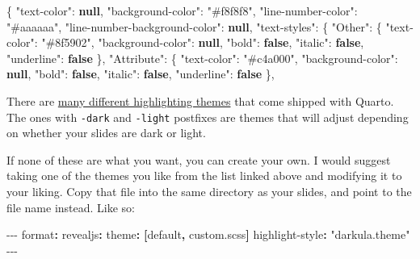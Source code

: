 \documentclass[
  letterpaper,
  DIV=11,
  numbers=noendperiod]{scrreprt}
\newenvironment{Shaded}{\begin{snugshade}}{\end{snugshade}}
\newcommand{\AttributeTok}[1]{\textcolor[rgb]{0.40,0.45,0.13}{#1}}
\newcommand{\DataTypeTok}[1]{\textcolor[rgb]{0.68,0.00,0.00}{#1}}
\newcommand{\FunctionTok}[1]{\textcolor[rgb]{0.28,0.35,0.67}{#1}}
\newcommand{\KeywordTok}[1]{\textcolor[rgb]{0.00,0.23,0.31}{\textbf{#1}}}
\newcommand{\PreprocessorTok}[1]{\textcolor[rgb]{0.68,0.00,0.00}{#1}}
\newcommand{\StringTok}[1]{\textcolor[rgb]{0.13,0.47,0.30}{#1}}
\begin{document}
\begin{Shaded}
\begin{Highlighting}[]
\FunctionTok{\{}
    \DataTypeTok{"text{-}color"}\FunctionTok{:} \KeywordTok{null}\FunctionTok{,}
    \DataTypeTok{"background{-}color"}\FunctionTok{:} \StringTok{"\#f8f8f8"}\FunctionTok{,}
    \DataTypeTok{"line{-}number{-}color"}\FunctionTok{:} \StringTok{"\#aaaaaa"}\FunctionTok{,}
    \DataTypeTok{"line{-}number{-}background{-}color"}\FunctionTok{:} \KeywordTok{null}\FunctionTok{,}
    \DataTypeTok{"text{-}styles"}\FunctionTok{:} \FunctionTok{\{}
        \DataTypeTok{"Other"}\FunctionTok{:} \FunctionTok{\{}
            \DataTypeTok{"text{-}color"}\FunctionTok{:} \StringTok{"\#8f5902"}\FunctionTok{,}
            \DataTypeTok{"background{-}color"}\FunctionTok{:} \KeywordTok{null}\FunctionTok{,}
            \DataTypeTok{"bold"}\FunctionTok{:} \KeywordTok{false}\FunctionTok{,}
            \DataTypeTok{"italic"}\FunctionTok{:} \KeywordTok{false}\FunctionTok{,}
            \DataTypeTok{"underline"}\FunctionTok{:} \KeywordTok{false}
        \FunctionTok{\},}
        \DataTypeTok{"Attribute"}\FunctionTok{:} \FunctionTok{\{}
            \DataTypeTok{"text{-}color"}\FunctionTok{:} \StringTok{"\#c4a000"}\FunctionTok{,}
            \DataTypeTok{"background{-}color"}\FunctionTok{:} \KeywordTok{null}\FunctionTok{,}
            \DataTypeTok{"bold"}\FunctionTok{:} \KeywordTok{false}\FunctionTok{,}
            \DataTypeTok{"italic"}\FunctionTok{:} \KeywordTok{false}\FunctionTok{,}
            \DataTypeTok{"underline"}\FunctionTok{:} \KeywordTok{false}
        \FunctionTok{\},}
\end{Highlighting}
\end{Shaded}

There are
\href{https://github.com/quarto-dev/quarto-cli/tree/main/src/resources/pandoc/highlight-styles}{many
different highlighting themes} that come shipped with Quarto. The ones
with \texttt{-dark} and \texttt{-light} postfixes are themes that will
adjust depending on whether your slides are dark or light.

If none of these are what you want, you can create your own. I would
suggest taking one of the themes you like from the list linked above and
modifying it to your liking. Copy that file into the same directory as
your slides, and point to the file name instead. Like so:

\begin{Shaded}
\begin{Highlighting}[]
\PreprocessorTok{{-}{-}{-}}
\FunctionTok{format}\KeywordTok{:}
\AttributeTok{  }\FunctionTok{revealjs}\KeywordTok{:}\AttributeTok{ }
\AttributeTok{    }\FunctionTok{theme}\KeywordTok{:}\AttributeTok{ }\KeywordTok{[}\AttributeTok{default}\KeywordTok{,}\AttributeTok{ custom.scss}\KeywordTok{]}
\FunctionTok{highlight{-}style}\KeywordTok{:}\AttributeTok{ }\StringTok{"darkula.theme"}
\PreprocessorTok{{-}{-}{-}}
\end{Highlighting}
\end{Shaded}
\end{document}
